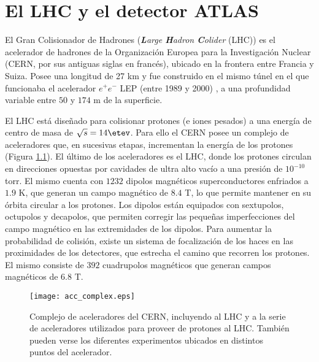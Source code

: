 \chapter{El LHC y el detector ATLAS}



El Gran Colisionador de Hadrones (\textit{\textbf{L}arge \textbf{H}adron \textbf{C}olider} (LHC)) \cite{Evans:1129806} es el acelerador de hadrones de la Organización Europea para la Investigación Nuclear (CERN, por sus antiguas siglas en francés), ubicado en la frontera entre Francia y Suiza. Posee una longitud de 27 km y fue construido en el mismo túnel en el que funcionaba el acelerador $e^{+}e^{-}$ LEP (entre 1989 y 2000) \cite{LEPbook}, a una profundidad variable entre $50$ y $174$ m de la superficie.

El LHC está diseñado para colisionar protones (e iones pesados) a una energía de centro de masa de $\sqrt{s}=14 \etev$. Para ello el CERN posee un complejo de aceleradores que, en sucesivas etapas, incrementan la energía de los protones (Figura \ref{acc_complex}). El último de los aceleradores es el LHC, donde los protones circulan en direcciones opuestas por cavidades de ultra alto vacío a una presión de $10^{-10}$ torr. El mismo cuenta con $1232$ dipolos magnéticos superconductores enfriados a $1.9$ K, que generan un campo magnético de $8.4$ T, lo que permite mantener en su órbita circular a los protones. Los dipolos están equipados con sextupolos, octupolos y decapolos, que permiten corregir las pequeñas imperfecciones del campo magnético en las extremidades de los dipolos. Para aumentar la probabilidad de colisión, existe un sistema de focalización de los haces en las proximidades de los detectores, que estrecha el camino que recorren los protones. El mismo consiste de $392$ cuadrupolos magnéticos que generan campos magnéticos de $6.8$ T. 

\begin{figure}[ht]
\centering
\texttt{[image: acc\_complex.eps]}
\caption{Complejo de aceleradores del CERN, incluyendo al LHC y a la serie de aceleradores utilizados para proveer de protones al LHC. También pueden verse los diferentes experimentos ubicados en distintos puntos del acelerador.}
\label{acc_complex}
\end{figure}

